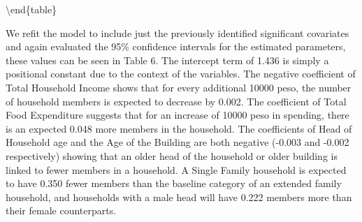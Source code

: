 \documentclass[
]{article}
\begin{document}
\textbackslash end\{table\}

We refit the model to include just the previously identified significant
covariates and again evaluated the 95\% confidence intervals for the
estimated parameters, these values can be seen in Table 6. The intercept
term of 1.436 is simply a positional constant due to the context of the
variables. The negative coefficient of Total Household Income shows that
for every additional 10000 peso, the number of household members is
expected to decrease by 0.002. The coefficient of Total Food Expenditure
suggests that for an increase of 10000 peso in spending, there is an
expected 0.048 more members in the household. The coefficients of Head
of Household age and the Age of the Building are both negative (-0.003
and -0.002 respectively) showing that an older head of the household or
older building is linked to fewer members in a household. A Single
Family household is expected to have 0.350 fewer members than the
baseline category of an extended family household, and households with a
male head will have 0.222 members more than their female counterparts.
\end{document}
